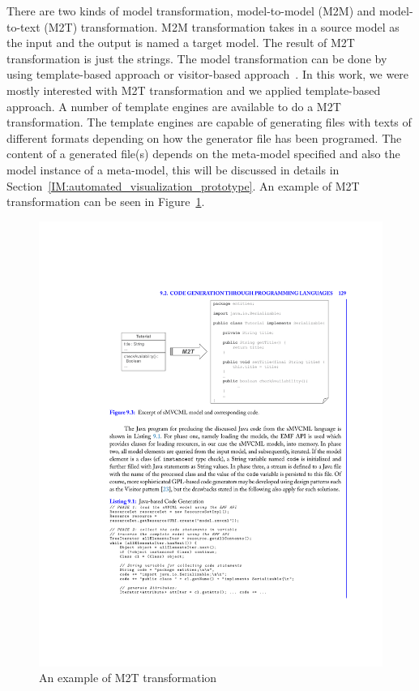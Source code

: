 There are two kinds of model transformation, model-to-model (M2M) and model-to-text (M2T) transformation. M2M transformation takes in a source model as the input and the output is named a target model. The result of M2T transformation is just the strings. The model transformation can be done by using  template-based approach or visitor-based approach~\cite{Czarnecki}. In this work, we were mostly interested with M2T transformation and we applied template-based approach. A number of template engines are available to do a M2T transformation. The template engines are capable of generating files with texts of different formats depending on how the generator file has been programed. The content of a generated file(s) depends on the meta-model specified and also the model instance of a meta-model, this will be discussed in details in Section~\ref{IM:automated_visualization_prototype}. An example of M2T transformation can be seen in Figure~\ref{fig:brambilla-m2t}. \\

\begin{figure}[H]
\centering
\captionsetup{justification=centering}
\vspace{0cm}%
\includegraphics[width=0.8\linewidth]{figure/literatures/brambilla_m2t_example.pdf}
\caption{An example of M2T transformation~\cite{Brambilla}}
\label{fig:brambilla-m2t}
\end{figure}

